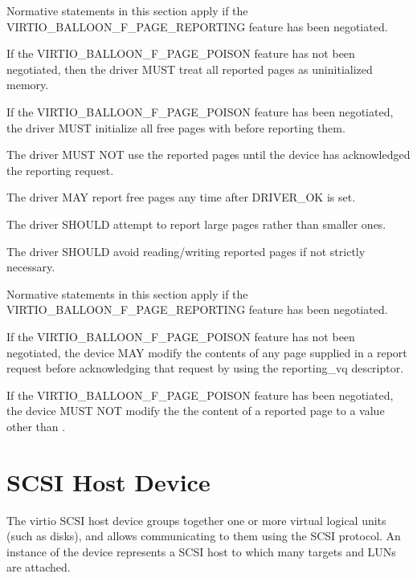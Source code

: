 
Normative statements in this section apply if the
VIRTIO_BALLOON_F_PAGE_REPORTING feature has been negotiated.

If the VIRTIO_BALLOON_F_PAGE_POISON feature has not been negotiated, then
the driver MUST treat all reported pages as uninitialized memory.

If the VIRTIO_BALLOON_F_PAGE_POISON feature has been negotiated, the
driver MUST initialize all free pages with  before
reporting them.

The driver MUST NOT use the reported pages until the device has
acknowledged the reporting request.

The driver MAY report free pages any time after DRIVER_OK is set.

The driver SHOULD attempt to report large pages rather than smaller ones.

The driver SHOULD avoid reading/writing reported pages if
not strictly necessary.


Normative statements in this section apply if the
VIRTIO_BALLOON_F_PAGE_REPORTING feature has been negotiated.

If the VIRTIO_BALLOON_F_PAGE_POISON feature has not been negotiated, the
device MAY modify the contents of any page supplied in a report request
before acknowledging that request by using the reporting_vq descriptor.

If the VIRTIO_BALLOON_F_PAGE_POISON feature has been negotiated, the device
MUST NOT modify the the content of a reported page to a value other than
.

\section{SCSI Host Device}\label{sec:Device Types / SCSI Host Device}

The virtio SCSI host device groups together one or more virtual
logical units (such as disks), and allows communicating to them
using the SCSI protocol. An instance of the device represents a
SCSI host to which many targets and LUNs are attached.

